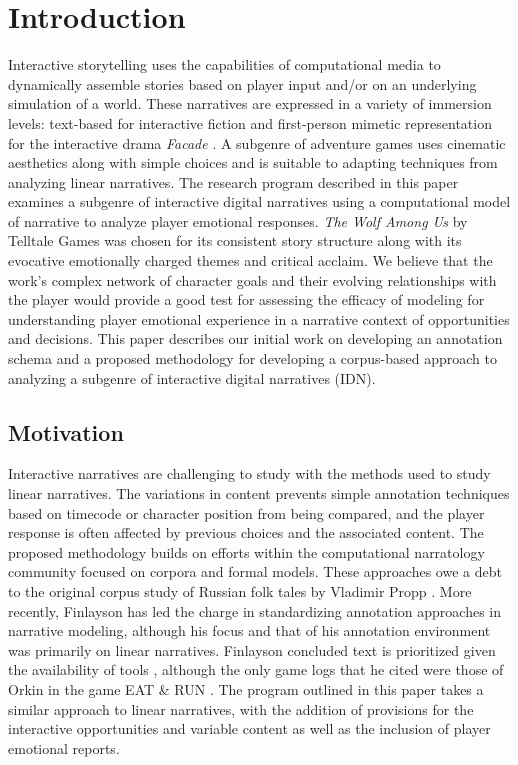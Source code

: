 \section{Introduction}
\label{sec:orgheadline3}
Interactive storytelling uses the capabilities of computational media
to dynamically assemble stories based on player input and/or on an
underlying simulation of a world. These narratives are expressed in a
variety of immersion levels: text-based for interactive fiction and
first-person mimetic representation for the interactive drama \emph{Facade}
\cite{Mateas2003-ty}. A subgenre of adventure games uses cinematic
aesthetics along with simple choices and is suitable to adapting
techniques from analyzing linear narratives. The research program
described in this paper examines a subgenre of interactive digital
narratives using a computational model of narrative to analyze player
emotional responses. \emph{The Wolf Among Us} by Telltale Games was chosen
for its consistent story structure along with its evocative
emotionally charged themes and critical acclaim. We believe that the
work's complex network of character goals and their evolving
relationships with the player would provide a good test for assessing
the efficacy of modeling for understanding player emotional experience
in a narrative context of opportunities and decisions. This paper
describes our initial work on developing an annotation schema and a
proposed methodology for developing a corpus-based approach to
analyzing a subgenre of interactive digital narratives (IDN).

\subsection{Motivation}
\label{sec:orgheadline1}
Interactive narratives are challenging to study with the methods used
to study linear narratives. The variations in content prevents simple
annotation techniques based on timecode or character position from
being compared, and the player response is often affected by previous
choices and the associated content. The proposed methodology builds on
efforts within the computational narratology community focused on
corpora and formal models. These approaches owe a debt to the original
corpus study of Russian folk tales by Vladimir Propp
\cite{Propp1928-pk}. More recently, Finlayson has led the charge in
standardizing annotation approaches in narrative modeling, although
his focus and that of his annotation environment was primarily on
linear narratives. Finlayson concluded text is prioritized given the
availability of tools \cite{Finlayson2013-wi}, although the only game
logs that he cited were those of Orkin in the game EAT \& RUN
\cite{Orkin2010-vr}. The program outlined in this paper takes a
similar approach to linear narratives, with the addition of provisions
for the interactive opportunities and variable content as well as the
inclusion of player emotional reports.

